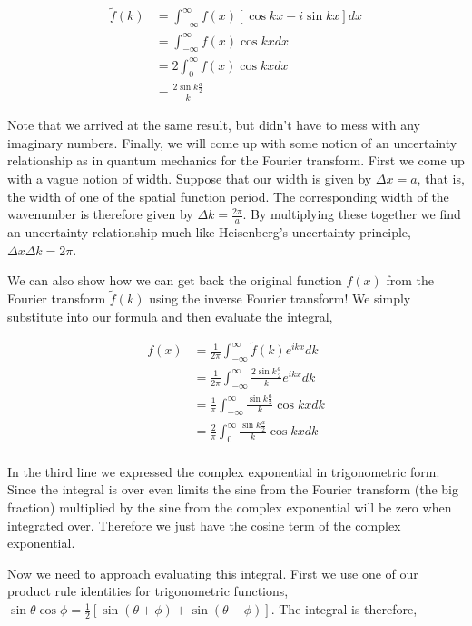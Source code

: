 \documentclass[11pt]{amsart}
\begin{document}
\begin{align*}
  \tilde{f}(k) &= \int_{-\infty}^{\infty} f(x) \left[\cos{kx}-i\sin{kx}\right] dx \\
               &= \int_{-\infty}^{\infty} f(x) \cos{kx} dx \\
               &= 2 \int_0^{\infty} f(x) \cos{kx} dx \\
               &= \frac{2\sin{k\frac{a}{2}}}{k}
\end{align*}

Note that we arrived at the same result, but didn't have to mess with any imaginary numbers. Finally, we will come up with some notion of an uncertainty relationship as in quantum mechanics for the Fourier transform. First we come up with a vague notion of width. Suppose that our width is given by $\Delta x = a$, that is, the width of one of the spatial function period. The corresponding width of the wavenumber is therefore given by $\Delta k = \frac{2\pi}{a}$. By multiplying these together we find an uncertainty relationship much like Heisenberg's uncertainty principle, $\Delta x \Delta k = 2\pi$.

We can also show how we can get back the original function $f(x)$ from the Fourier transform $\tilde{f}(k)$ using the inverse Fourier transform! We simply substitute into our formula and then evaluate the integral,

\begin{align*}
  f(x) &= \frac{1}{2\pi}\int_{-\infty}^{\infty} \tilde{f}(k) e^{ikx} dk \\
       &= \frac{1}{2\pi}\int_{-\infty}^{\infty} \frac{2\sin{k\frac{a}{2}}}{k} e^{ikx} dk \\
       &= \frac{1}{\pi}\int_{-\infty}^{\infty} \frac{\sin{k\frac{a}{2}}}{k} \cos{kx} dk \\
       &= \frac{2}{\pi}\int_{0}^{\infty} \frac{\sin{k\frac{a}{2}}}{k} \cos{kx} dk \\
\end{align*}

In the third line we expressed the complex exponential in trigonometric form. Since the integral is over even limits the sine from the Fourier transform (the big fraction) multiplied by the sine from the complex exponential will be zero when integrated over. Therefore we just have the cosine term of the complex exponential.

Now we need to approach evaluating this integral. First we use one of our product rule identities for trigonometric functions, $\sin{\theta}\cos{\phi} = \frac{1}{2}\left[\sin{(\theta+\phi)}+\sin{(\theta-\phi)}\right]$. The integral is therefore,
\end{document}
